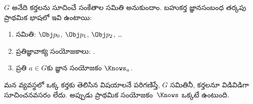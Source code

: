 \documentclass[../../../include/open-logic-section]{subfiles}
\begin{document}


\begin{defn}
$G$ అనేది కర్తలను సూచించే సంకేతాల సమితి అనుకుందాం.
బహుకర్త జ్ఞానసంబంధ తర్కపు ప్రాథమిక భాషలో ఇవి ఉంటాయి:
\begin{enumerate}
  \item {}
     సమితి: $\Obj
    p_0$, $\Obj p_1$, $\Obj p_2$, \dots
  \item ప్రతిజ్ఞావాక్య సంయోజకాలు: \startycommalist
  .
  \item ప్రతి $a \in G$కు జ్ఞాన సంయోజకం $\Knows_a$.
\end{enumerate}
\end{defn}

మన వ్యవస్థలో ఒక్క కర్తకు తెలిసిన విషయాలనే పరిగణిస్తే,
$G$ సమితినీ, కర్తలనూ విడివిడిగా సూచించనవసరం లేదు.
అప్పుడు ప్రాథమిక సంయోజకం~$\Knows$ ఒక్కటే ఉంటుంది.
\end{document}
